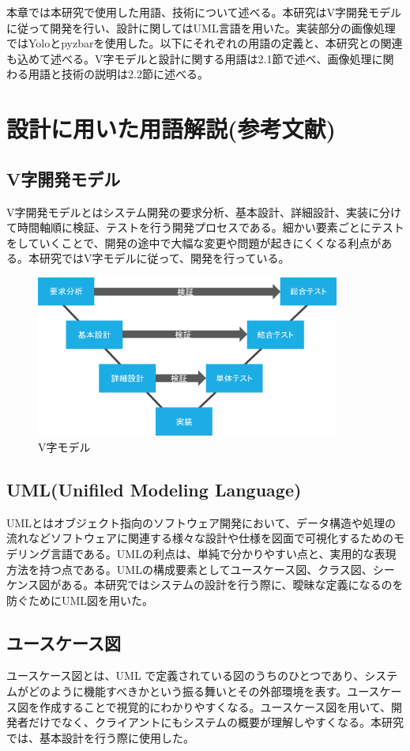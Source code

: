 本章では本研究で使用した用語、技術について述べる。本研究はV字開発モデルに従って開発を行い、設計に関してはUML言語を用いた。実装部分の画像処理ではYoloとpyzbarを使用した。以下にそれぞれの用語の定義と、本研究との関連も込めて述べる。V字モデルと設計に関する用語は2.1節で述べ、画像処理に関わる用語と技術の説明は2.2節に述べる。

\section{設計に用いた用語解説(参考文献)}

\subsection*{V字開発モデル}
V字開発モデルとはシステム開発の要求分析、基本設計、詳細設計、実装に分けて時間軸順に検証、テストを行う開発プロセスである。細かい要素ごとにテストをしていくことで、開発の途中で大幅な変更や問題が起きにくくなる利点がある。本研究ではV字モデルに従って、開発を行っている。

\begin{figure}[htbp]
\centering
\includegraphics[width=10cm]{./pic/vjimodel.eps}
\caption{V字モデル}
\label{v_model}
\end{figure}

\subsection*{UML(Unifiled Modeling Language)}
UMLとはオブジェクト指向のソフトウェア開発において、データ構造や処理の流れなどソフトウェアに関連する様々な設計や仕様を図面で可視化するためのモデリング言語である。UMLの利点は、単純で分かりやすい点と、実用的な表現方法を持つ点である。UMLの構成要素としてユースケース図、クラス図、シーケンス図がある\cite{uml}。本研究ではシステムの設計を行う際に、曖昧な定義になるのを防ぐためにUML図を用いた。

\subsection*{ユースケース図}
ユースケース図とは、UML で定義されている図のうちのひとつであり、システムがどのように機能すべきかという振る舞いとその外部環境を表す。ユースケース図を作成することで視覚的にわかりやすくなる。ユースケース図を用いて、開発者だけでなく、クライアントにもシステムの概要が理解しやすくなる。本研究では、基本設計を行う際に使用した。


